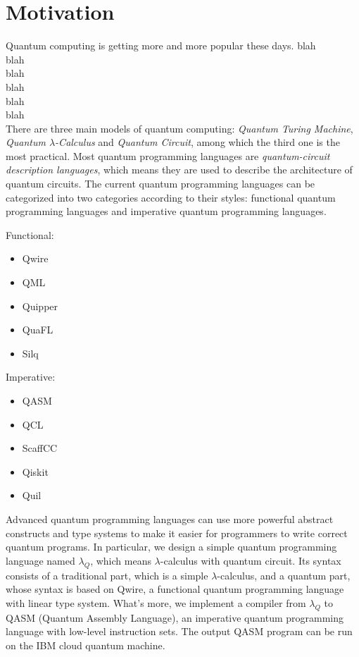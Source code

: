 \section{Motivation}
Quantum computing is getting more and more popular these days.
blah\\
blah\\
blah\\
blah\\
blah\\
blah\\

There are three main models of quantum computing: \textit{Quantum Turing Machine}, \textit{Quantum $\lambda$-Calculus} and \textit{Quantum Circuit}, among which the third one is the most practical.
Most quantum programming languages are \textit{quantum-circuit description languages}, which means they are used to describe the architecture of quantum circuits.
The current quantum programming languages can be categorized into two categories according to their styles: functional quantum programming languages and imperative quantum programming languages.
\begin{multicols}{2}
  \begin{center}
      Functional:
  \end{center}
\begin{itemize}
    \item Qwire
    \item QML
    \item Quipper
    \item QuaFL
    \item Silq
\end{itemize}

  \columnbreak

  \begin{center}
          Imperative:
  \end{center}
\begin{itemize}
    \item QASM
    \item QCL
    \item ScaffCC
    \item Qiskit
    \item Quil
\end{itemize}
\end{multicols}

Advanced quantum programming languages can use more powerful abstract constructs and type systems to make it easier for programmers to write correct quantum programs.
In particular, we design a simple quantum programming language named $\lambda_Q$, which means $\lambda$-calculus with quantum circuit.
Its syntax consists of a traditional part, which is a simple $\lambda$-calculus, and a quantum part, whose syntax is based on Qwire, a functional quantum programming language with linear type system.
What's more, we implement a compiler from $\lambda_Q$ to QASM (Quantum Assembly Language), an imperative quantum programming language with low-level instruction sets.
The output QASM program can be run on the IBM cloud quantum machine.

